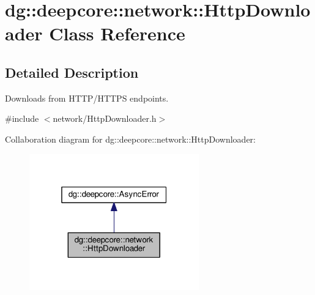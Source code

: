 \hypertarget{classdg_1_1deepcore_1_1network_1_1_http_downloader}{}\section{dg\+:\+:deepcore\+:\+:network\+:\+:Http\+Downloader Class Reference}
\label{classdg_1_1deepcore_1_1network_1_1_http_downloader}


\subsection{Detailed Description}
Downloads from H\+T\+T\+P/\+H\+T\+T\+PS endpoints. 

{\ttfamily \#include $<$network/\+Http\+Downloader.\+h$>$}



Collaboration diagram for dg\+:\+:deepcore\+:\+:network\+:\+:Http\+Downloader\+:
\nopagebreak
\begin{figure}[H]
\begin{center}
\leavevmode
\includegraphics[width=208pt]{classdg_1_1deepcore_1_1network_1_1_http_downloader__coll__graph}
\end{center}
\end{figure}
